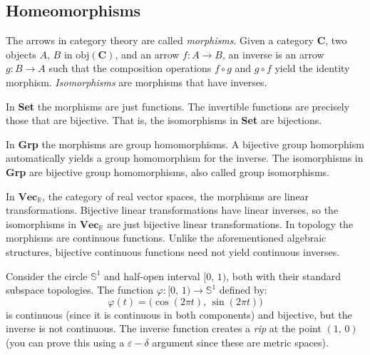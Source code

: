 \documentclass{article}
\theoremstyle{plain}
\theoremstyle{normal}
\newenvironment{example}{%
    \pushQED{\qed}\renewcommand{\qedsymbol}{$\blacksquare$}\examplex%
}{%
    \popQED\endexamplex%
}
\begin{document}
        \subsection{Homeomorphisms}
            The arrows in category theory are called \textit{morphisms}.%
            Given a category $\mathbf{C}$, two objects
            $A,\,B$ in $\textrm{obj}(\mathbf{C})$, and an arrow
            $f:A\rightarrow{B}$, an inverse is an arrow
            $g:B\rightarrow{A}$ such that the composition operations
            $f\circ{g}$ and $g\circ{f}$ yield the identity morphism.
            \textit{Isomorphisms}
            are morphisms that have inverses.
            \begin{example}
                In \textbf{Set} the morphisms are just functions. The
                invertible functions are precisely those that are bijective.
                That is, the isomorphisms in \textbf{Set} are bijections.
            \end{example}
            \begin{example}
                In \textbf{Grp} the morphisms are group homomorphisms. A
                bijective group homorphism automatically yields a group
                homomorphism for the inverse. The isomorphisms in
                \textbf{Grp} are bijective group homomorphisms, also called
                group isomorphisms.
            \end{example}
            \begin{example}
                In $\mathbf{Vec}_{\mathbb{R}}$, the category of real vector
                spaces, the morphisms are linear transformations. Bijective
                linear transformations have linear inverses, so the
                isomorphisms in $\mathbf{Vec}_{\mathbb{R}}$ are just bijective
                linear transformations.
            \end{example}
            In topology the morphisms are continuous functions. Unlike the
            aforementioned algebraic structures, bijective continuous functions
            need not yield continuous inverses.
            \begin{example}
                Consider the circle $\mathbb{S}^{1}$ and half-open interval
                $[0,\,1)$, both with their standard subspace topologies.
                The function $\varphi:[0,\,1)\rightarrow\mathbb{S}^{1}$ defined
                by:
                \begin{equation}
                    \varphi(t)=\big(\cos(2\pi{t}),\,\sin(2\pi{t})\big)
                \end{equation}
                is continuous (since it is continuous in both components) and
                bijective, but the inverse is not continuous. The inverse
                function creates a \textit{rip} at the point
                $(1,\,0)$ (you can prove this using a $\varepsilon-\delta$
                argument since these are metric spaces).%
            \end{example}
\end{document}
